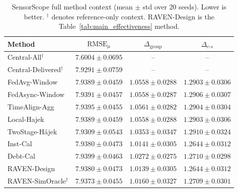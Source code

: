 \begin{table}[!htbp]
\centering
\caption{SensorScope full method context (mean $\pm$ std over 20 seeds).
Lower is better.  $^\dagger$ denotes reference-only context.
RAVEN-Design is the Table~\ref{tab:main_effectiveness} method.}
\label{tab:app_e3_sensorscope}
\scriptsize
\setlength{\tabcolsep}{3pt}
\begin{tabular*}{\columnwidth}{@{\extracolsep{\fill}}lccc}
\toprule
Method & $\mathrm{RMSE}_{\mu}$ & $\Delta_{\mathrm{group}}$ & $\Delta_{c\text{-}s}$\\
\midrule
Central-All$^{\dagger}$ & $7.6004\pm0.0695$ & -- & -- \\
Central-Delivered$^{\dagger}$ & $7.9291\pm0.0759$ & -- & -- \\
FedAvg-Window & $7.9389\pm0.0459$ & $1.0558\pm0.0288$ & $1.2903\pm0.0306$ \\
FedAsync-Window & $7.9391\pm0.0457$ & $1.0558\pm0.0287$ & $1.2906\pm0.0307$ \\
TimeAlign-Agg & $7.9395\pm0.0455$ & $1.0561\pm0.0282$ & $1.2904\pm0.0304$ \\
Local-Hajek & $7.9389\pm0.0459$ & $1.0558\pm0.0288$ & $1.2903\pm0.0306$ \\
TwoStage-H\'ajek & $7.9309\pm0.0543$ & $1.0353\pm0.0347$ & $1.2910\pm0.0324$ \\
Inst-Cal & $7.9380\pm0.0473$ & $1.0141\pm0.0305$ & $1.2644\pm0.0312$ \\
Debt-Cal & $7.9399\pm0.0463$ & $1.0272\pm0.0275$ & $1.2710\pm0.0298$ \\
RAVEN-Design & $7.9380\pm0.0473$ & $1.0139\pm0.0305$ & $1.2644\pm0.0312$ \\
RAVEN-SimOracle$^{\dagger}$ & $7.9373\pm0.0455$ & $1.0160\pm0.0327$ & $1.2709\pm0.0301$ \\
\bottomrule
\end{tabular*}
\end{table}

